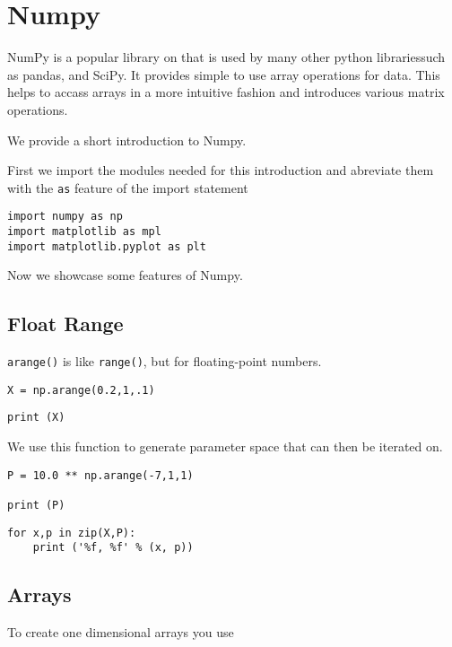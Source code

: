 \chapter{Numpy}\label{c:numpy}

NumPy is a popular library on that is used by many other python
librariessuch as pandas, and SciPy. It provides simple to use array
operations for data. This helps to accass arrays in a more intuitive
fashion and introduces various matrix operations.

We provide a short introduction to Numpy.

First we import the modules needed for this introduction and abreviate
them with the \texttt{as} feature of the import statement

\begin{lstlisting}
import numpy as np
import matplotlib as mpl
import matplotlib.pyplot as plt
\end{lstlisting}

Now we showcase some features of Numpy.

\section{Float Range}

\texttt{arange()} is like \texttt{range()}, but for floating-point
numbers.

\begin{lstlisting}
X = np.arange(0.2,1,.1)
\end{lstlisting}

\begin{lstlisting}
print (X)
\end{lstlisting}

We use this function to generate parameter space that can then be
iterated on.

\begin{lstlisting}
P = 10.0 ** np.arange(-7,1,1)

print (P)
\end{lstlisting}

\begin{lstlisting}
for x,p in zip(X,P):
    print ('%f, %f' % (x, p))
\end{lstlisting}

\section{Arrays}

To create one dimensional arrays you use

